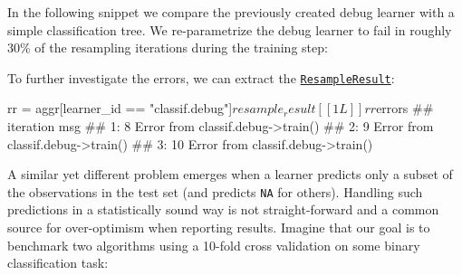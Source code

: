 \documentclass[]{article}
\newenvironment{Shaded}{}{}
\newcommand{\DataTypeTok}[1]{#1}
\newcommand{\FloatTok}[1]{#1}
\newcommand{\KeywordTok}[1]{\textcolor[rgb]{0.00,0.00,1.00}{#1}}
\newcommand{\NormalTok}[1]{#1}
\newcommand{\OperatorTok}[1]{#1}
\newcommand{\OtherTok}[1]{\textcolor[rgb]{1.00,0.25,0.00}{#1}}
\newcommand{\StringTok}[1]{\textcolor[rgb]{0.00,0.50,0.50}{#1}}
\renewenvironment{Shaded} {\begin{snugshade}\small} {\end{snugshade}}
\begin{document}
In the following snippet we compare the previously created debug learner with a simple classification tree.
We re-parametrize the debug learner to fail in roughly 30\% of the resampling iterations during the training step:

\begin{Shaded}
\end{Shaded}

To further investigate the errors, we can extract the \href{https://mlr3.mlr-org.com/reference/ResampleResult.html}{\texttt{ResampleResult}}:

\begin{Shaded}
\begin{Highlighting}[]
\NormalTok{rr =}\StringTok{ }\NormalTok{aggr[learner_id }\OperatorTok{==}\StringTok{ "classif.debug"}\NormalTok{]}\OperatorTok{$}\NormalTok{resample_result[[1L]]}
\NormalTok{rr}\OperatorTok{$}\NormalTok{errors}
\NormalTok{##    iteration                               msg}
\NormalTok{## 1:         8 Error from classif.debug->train()}
\NormalTok{## 2:         9 Error from classif.debug->train()}
\NormalTok{## 3:        10 Error from classif.debug->train()}
\end{Highlighting}
\end{Shaded}

A similar yet different problem emerges when a learner predicts only a subset of the observations in the test set (and predicts \texttt{NA} for others).
Handling such predictions in a statistically sound way is not straight-forward and a common source for over-optimism when reporting results.
Imagine that our goal is to benchmark two algorithms using a 10-fold cross validation on some binary classification task:
\end{document}
